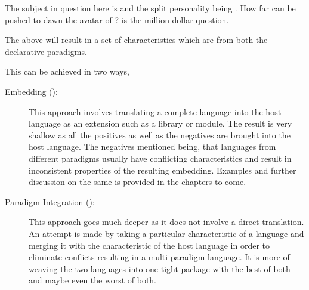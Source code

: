 \documentclass[thesis-solanki.tex]{subfiles}
\begin{document}
\par The subject in question here is  and the split personality being . How far can  be pushed to 
dawn the avatar of \xxx{ }?
 is the million dollar question.

The above will result in a set of characteristics which are from both the declarative paradigms. 
   
This can be achieved in two ways,
\begin{description}
\item [Embedding ():]

  This approach involves\xxx{,} translating a complete language into the host language as an extension such as a
  library  or module\xxx{ }.
  The result is very shallow as all the positives as well as the negatives are brought into the host language.
  The negatives mentioned being, that languages from different paradigms usually have conflicting characteristics
  and result in inconsistent properties of the resulting embedding.
  Examples and further discussion on the same is provided in the chapters to come.

\item [Paradigm Integration ():]

\par This approach goes much deeper as it does not involve a direct translation. An attempt is made by taking a particular characteristic of a language 
and merging it with the characteristic of the host language in order to eliminate conflicts resulting in a multi paradigm language. It is more of weaving 
the two languages into one tight package with the best of both and maybe even the worst of both.       
\end{description}


%
\end{document}
